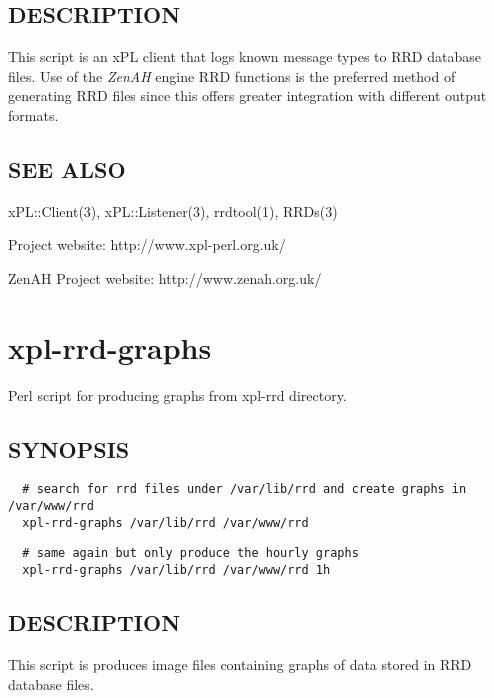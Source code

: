\documentclass[12pt,a4paper]{article}
\begin{document}
\subsection*{DESCRIPTION\label{xpl-rrd_DESCRIPTION}}


This script is an xPL client that logs known message types to RRD
database files.  Use of the \emph{ZenAH} engine RRD functions is the
preferred method of generating RRD files since this offers greater
integration with different output formats.

\subsection*{SEE ALSO\label{xpl-rrd_SEE_ALSO}}


xPL::Client(3), xPL::Listener(3), rrdtool(1), RRDs(3)



Project website: http://www.xpl-perl.org.uk/



ZenAH Project website: http://www.zenah.org.uk/

\newpage
\section{xpl-rrd-graphs\label{xpl-rrd-graphs}}


Perl script for producing graphs from xpl-rrd directory.

\subsection*{SYNOPSIS\label{xpl-rrd-graphs_SYNOPSIS}}
\begin{verbatim}
  # search for rrd files under /var/lib/rrd and create graphs in /var/www/rrd
  xpl-rrd-graphs /var/lib/rrd /var/www/rrd
\end{verbatim}
\begin{verbatim}
  # same again but only produce the hourly graphs
  xpl-rrd-graphs /var/lib/rrd /var/www/rrd 1h
\end{verbatim}
\subsection*{DESCRIPTION\label{xpl-rrd-graphs_DESCRIPTION}}


This script is produces image files containing graphs of data stored
in RRD database files.
\end{document}
